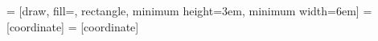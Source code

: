 

\newcommand{\spcb}{5.0cm} %
\newcommand{\sled}{0.1cm} %
\newcommand{\smic}{0.6cm} %
\newcommand{\boxh}{2.0cm} %
\newcommand{\boxw}{4.0cm} %

\newcommand{\rmic}{2.4cm} %
\newcommand{\rled}{1.6cm} %

\newcommand{\dw}{0.5cm} %
\newcommand{\daled}{-90} %
\newcommand{\damic}{90} %

\newcommand{\xl}{-7.0cm}
\newcommand{\xm}{0.0cm}
\newcommand{\xr}{7.0cm}

\newcommand{\yt}{9.0cm}
\newcommand{\ym}{4.0cm}
\newcommand{\yb}{0.0cm}



	
	
	 = [draw, fill=\blueFill, rectangle, 
	minimum height=3em, minimum width=6em]
	 = [coordinate]
	 = [coordinate]
	

